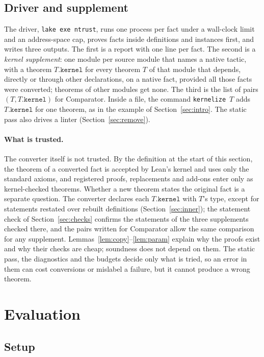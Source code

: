 \documentclass[11pt]{article}
\begin{document}
\subsection{Driver and supplement}\label{sec:driver}
The driver, \texttt{lake exe ntrust}, runs one process per fact under a wall-clock limit and an
address-space cap, proves facts inside definitions and instances first, and writes three outputs. The first is a
report with one line per fact. The second is a \emph{kernel supplement}: one module per source
module that names a native tactic, with a theorem \(T.\mathtt{kernel}\) for every theorem \(T\) of that module that depends,
directly or through other declarations, on a native fact, provided all those facts were converted;
theorems of other modules get none.
The third is the list of pairs \((T, T.\mathtt{kernel})\) for Comparator. Inside a file, the command
\texttt{kernelize}~\(T\) adds \(T.\mathtt{kernel}\) for one theorem, as in the example of
Section~\ref{sec:intro}. The static pass also drives a linter (Section~\ref{sec:remove}).

\paragraph{What is trusted.} The converter itself is not trusted. By the definition at the start of this
section, the theorem of a converted fact is accepted by Lean's kernel and uses only the standard axioms, and
registered proofs, replacements and add-ons enter only as kernel-checked theorems. Whether a new theorem states the original fact
is a separate question. The converter declares each \(T.\mathtt{kernel}\) with \(T\)'s type, except for
statements restated over rebuilt definitions (Section~\ref{sec:inner}); the statement check of
Section~\ref{sec:checks} confirms the statements of the three supplements checked there, and the pairs written
for Comparator allow the same comparison for any supplement. Lemmas~\ref{lem:copy}--\ref{lem:param} explain
why the proofs exist and why their checks are cheap; soundness does not depend on them. The static pass, the diagnostics and the budgets decide only what is tried, so an error in them can cost
conversions or mislabel a failure, but it cannot produce a wrong theorem.

\section{Evaluation}\label{sec:study}

\subsection{Setup}\label{sec:setup}
\end{document}

